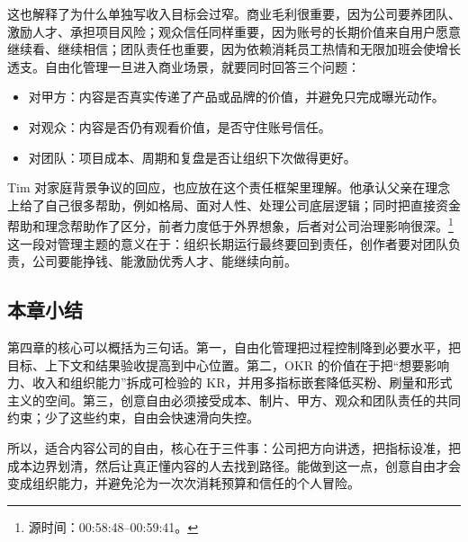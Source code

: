 这也解释了为什么单独写收入目标会过窄。商业毛利很重要，因为公司要养团队、激励人才、承担项目风险；观众信任同样重要，因为账号的长期价值来自用户愿意继续看、继续相信；团队责任也重要，因为依赖消耗员工热情和无限加班会使增长透支。自由化管理一旦进入商业场景，就要同时回答三个问题：

\begin{itemize}
  \item 对甲方：内容是否真实传递了产品或品牌的价值，并避免只完成曝光动作。
  \item 对观众：内容是否仍有观看价值，是否守住账号信任。
  \item 对团队：项目成本、周期和复盘是否让组织下次做得更好。
\end{itemize}

Tim 对家庭背景争议的回应，也应放在这个责任框架里理解。他承认父亲在理念上给了自己很多帮助，例如格局、面对人性、处理公司底层逻辑；同时把直接资金帮助和理念帮助作了区分，前者力度低于外界想象，后者对公司治理影响很深。\footnote{源时间：00:58:48--00:59:41。} 这一段对管理主题的意义在于：组织长期运行最终要回到责任，创作者要对团队负责，公司要能挣钱、能激励优秀人才、能继续向前。

\subsection{本章小结}

第四章的核心可以概括为三句话。第一，自由化管理把过程控制降到必要水平，把目标、上下文和结果验收提高到中心位置。第二，OKR 的价值在于把“想要影响力、收入和组织能力”拆成可检验的 KR，并用多指标嵌套降低买粉、刷量和形式主义的空间。第三，创意自由必须接受成本、制片、甲方、观众和团队责任的共同约束；少了这些约束，自由会快速滑向失控。

所以，适合内容公司的自由，核心在于三件事：公司把方向讲透，把指标设准，把成本边界划清，然后让真正懂内容的人去找到路径。能做到这一点，创意自由才会变成组织能力，并避免沦为一次次消耗预算和信任的个人冒险。
